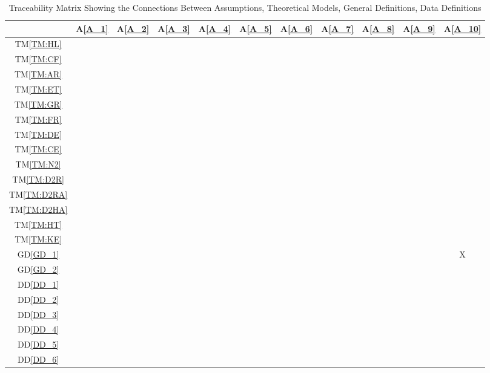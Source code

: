 \documentclass[12pt]{article}
\newcommand{\dref}[1]{GD\ref{#1}}
\newcommand{\ddref}[1]{DD\ref{#1}}
\newcommand{\tref}[1]{TM\ref{#1}}
\newcommand{\aref}[1]{A\ref{#1}}
\begin{document}
\begin{table}[H]
\centering
\begin{tabular}{|c|c|c|c|c|c|c|c|c|c|c|}
\hline
	& \aref{A_1}& \aref{A_2}& \aref{A_3}& \aref{A_4}& \aref{A_5}& \aref{A_6}& \aref{A_7}& \aref{A_8}& \aref{A_9}& \aref{A_10}\\
\hline
\tref{TM:HL}        & & & & & & & & & & \\ \hline
\tref{TM:CF}        & & & & & & & & & & \\ \hline
\tref{TM:AR}        & & & & & & & & & & \\ \hline
\tref{TM:ET}        & & & & & & & & & & \\ \hline
\tref{TM:GR}        & & & & & & & & & & \\ \hline
\tref{TM:FR}        & & & & & & & & & & \\ \hline
\tref{TM:DE}        & & & & & & & & & & \\ \hline
\tref{TM:CE}        & & & & & & & & & & \\ \hline
\tref{TM:N2}        & & & & & & & & & & \\ \hline
\tref{TM:D2R}       & & & & & & & & & & \\ \hline
\tref{TM:D2RA}      & & & & & & & & & & \\ \hline
\tref{TM:D2HA}      & & & & & & & & & & \\ \hline
\tref{TM:HT}        & & & & & & & & & & \\ \hline
\tref{TM:KE}        & & & & & & & & & & \\ \hline
\dref{GD_1}         & & & & & & & & & &X \\ \hline
\dref{GD_2}         & & & & & & & & & & \\ \hline
\ddref{DD_1}        & & & & & & & & & & \\ \hline
\ddref{DD_2}        & & & & & & & & & & \\ \hline
\ddref{DD_3}        & & & & & & & & & & \\ \hline
\ddref{DD_4}        & & & & & & & & & & \\ \hline
\ddref{DD_5}        & & & & & & & & & & \\ \hline
\ddref{DD_6}        & & & & & & & & & & \\ \hline
\end{tabular}
\caption{Traceability Matrix Showing the Connections Between Assumptions, Theoretical Models, General Definitions, Data Definitions}
\label{Table:trace_Assumptions_TM}
\end{table}
\end{document}
